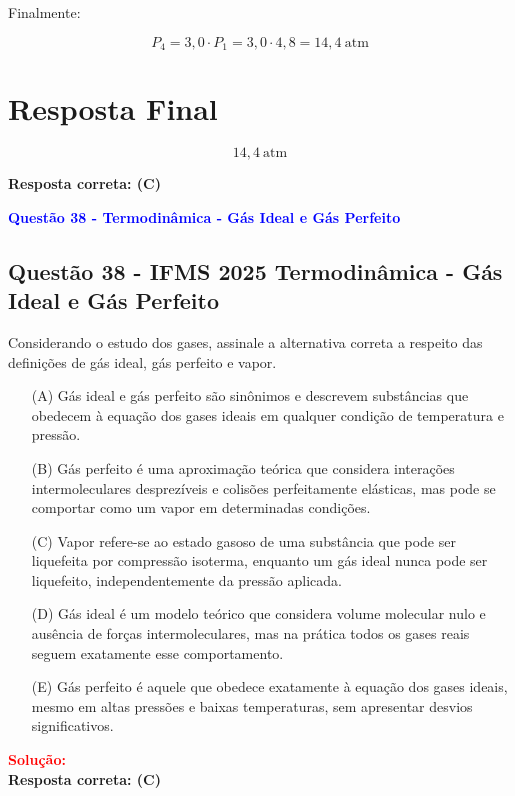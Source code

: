 \begin{flushleft}
Finalmente:

\begin{equation}
P_4 = 3{,}0 \cdot P_1 = 3{,}0 \cdot 4{,}8 = 14{,}4 \ \text{atm}
\end{equation}

\section*{Resposta Final}

\[
\boxed{14{,}4 \ \text{atm}}
\]

\textbf{Resposta correta: \colorbox{green!50}{(C)}}

\end{flushleft}

\begin{flushleft}
\textbf{\textcolor{blue}{\Large Quest\~ao 38 - Termodinâmica - G\'as Ideal e G\'as Perfeito}}\\

\subsection{Quest\~ao 38 - IFMS 2025 Termodinâmica - G\'as Ideal e G\'as Perfeito}
Considerando o estudo dos gases, assinale a
alternativa correta a respeito das definições de
gás ideal, gás perfeito e vapor.

\begin{itemize}
    \item[(A)] Gás ideal e gás perfeito são sinônimos e
    descrevem substâncias que obedecem à
    equação dos gases ideais em qualquer condição
    de temperatura e pressão.
    \item[(B)] Gás perfeito é uma aproximação teórica que
    considera
    interações
    intermoleculares
    desprezíveis e colisões perfeitamente elásticas,
    mas pode se comportar como um vapor em
    determinadas condições.
    \item[(\colorbox{green!50}{C})] Vapor refere-se ao estado gasoso de uma
    substância que pode ser liquefeita por
    compressão isoterma, enquanto um gás ideal
    nunca pode ser liquefeito, independentemente da
    pressão aplicada.
    \item[(D)] Gás ideal é um modelo teórico que considera
    volume molecular nulo e ausência de forças
    intermoleculares, mas na prática todos os gases
    reais seguem exatamente esse comportamento.
    \item[(E)] Gás perfeito é aquele que obedece exatamente à
    equação dos gases ideais, mesmo em altas
    pressões e baixas temperaturas, sem apresentar
    desvios significativos.
\end{itemize}

\vspace{0.5cm}

\textcolor{red}{\textbf{Solução:}}\\

\textbf{Resposta correta: \colorbox{green!50}{(C)}}

\end{flushleft}

